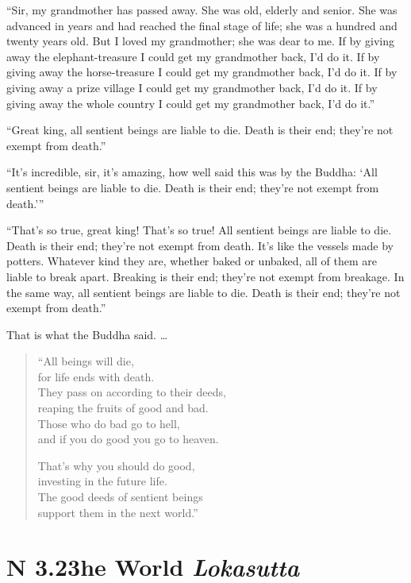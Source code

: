 \documentclass[12pt,openany]{book}%
\newcommand*{\suttatitleacronym}[1]{\smaller[2]{#1}\vspace*{.3em}}
\newcommand*{\suttatitletranslation}[1]{\linebreak{#1}}
\newcommand*{\suttatitleroot}[1]{\linebreak\smaller[2]\itshape{#1}}
\newcommand*{\tocacronym}[1]{\hspace*{-3.3em}{#1}\quad}
\newcommand*{\toctranslation}[1]{#1}
\newcommand*{\tocroot}[1]{(\textit{#1})}
\begin{document}
“Sir, my grandmother has passed away. She was old, elderly and senior. She was advanced in years and had reached the final stage of life; she was a hundred and twenty years old. But I loved my grandmother; she was dear to me. If by giving away the elephant-treasure I could get my grandmother back, I’d do it. If by giving away the horse-treasure I could get my grandmother back, I’d do it. If by giving away a prize village I could get my grandmother back, I’d do it. If by giving away the whole country I could get my grandmother back, I’d do it.” 

“Great king, all sentient beings are liable to die. Death is their end; they’re not exempt from death.” 

“It’s incredible, sir, it’s amazing, how well said this was by the Buddha: ‘All sentient beings are liable to die. Death is their end; they’re not exempt from death.’” 

“That’s so true, great king! That’s so true! All sentient beings are liable to die. Death is their end; they’re not exempt from death. It’s like the vessels made by potters. Whatever kind they are, whether baked or unbaked, all of them are liable to break apart. Breaking is their end; they’re not exempt from breakage. In the same way, all sentient beings are liable to die. Death is their end; they’re not exempt from death.” 

That is what the Buddha said. … 

\begin{verse}%
“All beings will die, \\
for life ends with death. \\
They pass on according to their deeds, \\
reaping the fruits of good and bad. \\
Those who do bad go to hell, \\
and if you do good you go to heaven. 

That’s why you should do good, \\
investing in the future life. \\
The good deeds of sentient beings \\
support them in the next world.” 

%
\end{verse}

%
\section*{{\suttatitleacronym SN 3.23}{\suttatitletranslation The World }{\suttatitleroot Lokasutta}}
\addcontentsline{toc}{section}{\tocacronym{SN 3.23} \toctranslation{The World } \tocroot{Lokasutta}}
\end{document}
